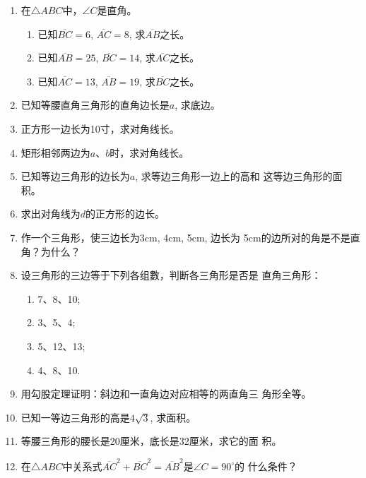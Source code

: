 \begin{ex}
\begin{enumerate}
    \item 在$\triangle ABC$中，$\angle C$是直角。
    \begin{enumerate}
        \item 已知$\overline{BC}=6$, $\overline{AC}=8$, 求$\overline{AB}$之长。
        \item 已知$\overline{AB}=25$, $\overline{BC}=14$, 求$\overline{AC}$之长。
        \item 已知$\overline{AC}=13$, $\overline{AB}=19$, 求$\overline{BC}$之长。
    \end{enumerate}
    
    
    \item 已知等腰直角三角形的直角边长是$a$, 求底边。
    \item 正方形一边长为10寸，求对角线长。
    \item 矩形相邻两边为$a$、$b$时，求对角线长。
    \item 已知等边三角形的边长为$a$, 求等边三角形一边上的高和
    这等边三角形的面积。
    \item 求出对角线为$d$的正方形的边长。
    \item 作一个三角形，使三边长为3cm, 4cm, 5cm, 边长为
    5cm的边所对的角是不是直角？为什么？
    \item 设三角形的三边等于下列各组數，判断各三角形是否是
    直角三角形：
\begin{multicols}{2}
    \begin{enumerate}
        \item 7、8、10;
        \item 3、5、4;
        \item 5、12、13;
        \item 4、8、10.
    \end{enumerate}
\end{multicols}
    \item 用勾股定理证明：斜边和一直角边对应相等的两直角三
    角形全等。
    \item 已知一等边三角形的高是$4\sqrt{3}$, 求面积。
    \item 等腰三角形的腰长是20厘米，底长是32厘米，求它的面
    积。
    \item 在$\triangle ABC$中关系式$\overline{AC}^2+\overline{BC}^2=\overline{AB}^2$是$\angle C=90^{\circ}$的
    什么条件？
\end{enumerate}
\end{ex}


